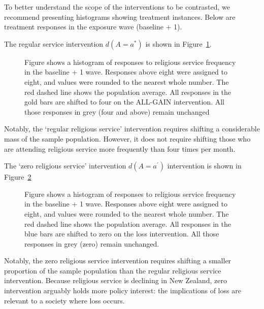\documentclass[
  single column]{article}
\begin{document}
To better understand the scope of the interventions to be contrasted, we
recommend presenting histograms showing treatment instances. Below are
treatment responses in the exposure wave (baseline + 1).

The regular service intervention \(d(A=a^*)\) is shown in
Figure~\ref{fig-0up}.

\begin{figure}


\caption{\label{fig-0up}Figure shows a histogram of responses to
religious service frequency in the baseline + 1 wave. Responses above
eight were assigned to eight, and values were rounded to the nearest
whole number. The red dashed line shows the population average. All
responses in the gold bars are shifted to four on the ALL-GAIN
intervention. All those responses in grey (four and above) remain
unchanged}

\end{figure}%

Notably, the `regular religious service' intervention requires shifting
a considerable mass of the sample population. However, it does not
require shifting those who are attending religious service more
frequently than four times per month.

The `zero religious service' intervention \(d(A=a^\prime)\) intervention
is shown in Figure~\ref{fig-0down}

\begin{figure}


\caption{\label{fig-0down}Figure shows a histogram of responses to
religious service frequency in the baseline + 1 wave. Responses above
eight were assigned to eight, and values were rounded to the nearest
whole number. The red dashed line shows the population average. All
responses in the blue bars are shifted to zero on the loss intervention.
All those responses in grey (zero) remain unchanged.}

\end{figure}%

Notably, the zero religious service intervention requires shifting a
smaller proportion of the sample population than the regular religious
service intervention. Because religious service is declining in New
Zealand, zero intervention arguably holds more policy interest: the
implications of loss are relevant to a society where loss occurs.
\end{document}
